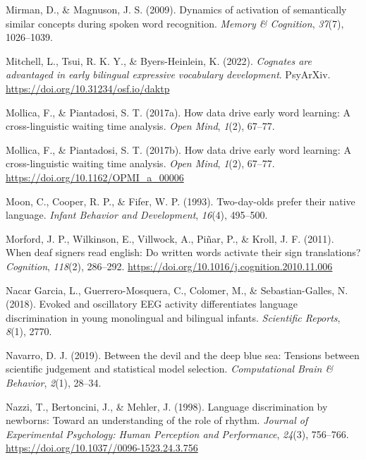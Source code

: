 \documentclass[
  12pt,
  b5paperpaper,
  twoside]{scrreprt}
\newlength{\cslhangindent}
\newlength{\cslentryspacingunit} %
\newenvironment{CSLReferences}[2] %
 {%
  \setlength{\parindent}{0pt}
  \ifodd #1
  \let\oldpar\par
  \def\par{\hangindent=\cslhangindent\oldpar}
  \fi
  \setlength{\parskip}{#2\cslentryspacingunit}
 }%
 {}
\begin{document}
\begin{CSLReferences}{1}{0}
\leavevmode{}%
Mirman, D., \& Magnuson, J. S. (2009). Dynamics of activation of
semantically similar concepts during spoken word recognition.
\emph{Memory \& Cognition}, \emph{37}(7), 1026--1039.

\leavevmode{}%
Mitchell, L., Tsui, R. K. Y., \& Byers-Heinlein, K. (2022).
\emph{Cognates are advantaged in early bilingual expressive vocabulary
development}. {PsyArXiv}. \url{https://doi.org/10.31234/osf.io/daktp}

\leavevmode{}%
Mollica, F., \& Piantadosi, S. T. (2017a). How data drive early word
learning: A cross-linguistic waiting time analysis. \emph{Open Mind},
\emph{1}(2), 67--77.

\leavevmode{}%
Mollica, F., \& Piantadosi, S. T. (2017b). How data drive early word
learning: A cross-linguistic waiting time analysis. \emph{Open Mind},
\emph{1}(2), 67--77. \url{https://doi.org/10.1162/OPMI_a_00006}

\leavevmode{}%
Moon, C., Cooper, R. P., \& Fifer, W. P. (1993). Two-day-olds prefer
their native language. \emph{Infant Behavior and Development},
\emph{16}(4), 495--500.

\leavevmode{}%
Morford, J. P., Wilkinson, E., Villwock, A., Piñar, P., \& Kroll, J. F.
(2011). When deaf signers read english: Do written words activate their
sign translations? \emph{Cognition}, \emph{118}(2), 286--292.
\url{https://doi.org/10.1016/j.cognition.2010.11.006}

\leavevmode{}%
Nacar Garcia, L., Guerrero-Mosquera, C., Colomer, M., \&
Sebastian-Galles, N. (2018). Evoked and oscillatory EEG activity
differentiates language discrimination in young monolingual and
bilingual infants. \emph{Scientific Reports}, \emph{8}(1), 2770.

\leavevmode{}%
Navarro, D. J. (2019). Between the devil and the deep blue sea: Tensions
between scientific judgement and statistical model selection.
\emph{Computational Brain \& Behavior}, \emph{2}(1), 28--34.

\leavevmode{}%
Nazzi, T., Bertoncini, J., \& Mehler, J. (1998). Language discrimination
by newborns: Toward an understanding of the role of rhythm.
\emph{Journal of Experimental Psychology: Human Perception and
Performance}, \emph{24}(3), 756--766.
\url{https://doi.org/10.1037//0096-1523.24.3.756}


\end{CSLReferences}
\end{document}

